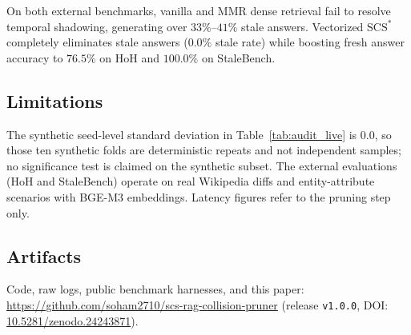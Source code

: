 \documentclass[11pt,a4paper]{article}
\theoremstyle{definition}
\newcommand{\SCS}{\mathrm{SCS}^*}
\begin{document}
On both external benchmarks, vanilla and MMR dense retrieval fail to resolve temporal shadowing, generating over $33\%$--$41\%$ stale answers. Vectorized $\SCS$ completely eliminates stale answers ($0.0\%$ stale rate) while boosting fresh answer accuracy to $76.5\%$ on HoH and $100.0\%$ on StaleBench.

\subsection*{Limitations}
The synthetic seed-level standard deviation in Table~\ref{tab:audit_live} is $0.0$, so those ten synthetic folds are deterministic repeats and not independent samples; no significance test is claimed on the synthetic subset. The external evaluations (HoH and StaleBench) operate on real Wikipedia diffs and entity-attribute scenarios with BGE-M3 embeddings. Latency figures refer to the pruning step only.

\subsection*{Artifacts}
Code, raw logs, public benchmark harnesses, and this paper: \url{https://github.com/soham2710/scs-rag-collision-pruner} (release \texttt{v1.0.0}, DOI: \href{https://doi.org/10.5281/zenodo.24243871}{10.5281/zenodo.24243871}).
\end{document}
